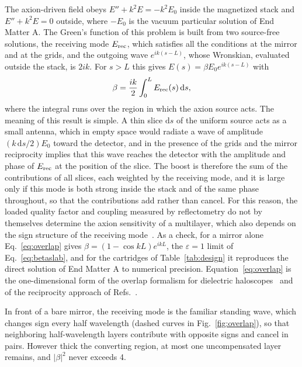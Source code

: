 \documentclass[
  aps,prl,reprint,superscriptaddress,
  amsmath,amssymb,floatfix,nofootinbib
]{revtex4-2}
\newcommand{\dd}{\mathrm d}
\begin{document}
The axion-driven field obeys $E''+k^2E=-k^2E_0$ inside the magnetized stack and $E''+k^2E=0$ outside, where $-E_0$ is the vacuum particular solution of End Matter A. The Green's function of this problem is built from two source-free solutions, the receiving mode $E_{\rm rec}$, which satisfies all the conditions at the mirror and at the grids, and the outgoing wave $e^{ik(s-L)}$, whose Wronskian, evaluated outside the stack, is $2ik$. For $s>L$ this gives $E(s)=\beta E_0e^{ik(s-L)}$ with
\begin{equation}
\beta=\frac{ik}{2}\int_0^L E_{\rm rec}(s)\,\dd s ,
\label{eq:overlap}
\end{equation}
where the integral runs over the region in which the axion source acts. The meaning of this result is simple. A thin slice $\dd s$ of the uniform source acts as a small antenna, which in empty space would radiate a wave of amplitude $(k\,\dd s/2)E_0$ toward the detector, and in the presence of the grids and the mirror reciprocity implies that this wave reaches the detector with the amplitude and phase of $E_{\rm rec}$ at the position of the slice. The boost is therefore the sum of the contributions of all slices, each weighted by the receiving mode, and it is large only if this mode is both strong inside the stack and of the same phase throughout, so that the contributions add rather than cancel. For this reason, the loaded quality factor and coupling measured by reflectometry do not by themselves determine the axion sensitivity of a multilayer, which also depends on the sign structure of the receiving mode~\cite{Garutti:2026asa}. As a check, for a mirror alone Eq.~\eqref{eq:overlap} gives $\beta=(1-\cos kL)e^{ikL}$, the $\varepsilon=1$ limit of Eq.~\eqref{eq:betaslab}, and for the cartridges of Table~\ref{tab:design} it reproduces the direct solution of End Matter A to numerical precision. Equation~\eqref{eq:overlap} is the one-dimensional form of the overlap formalism for dielectric haloscopes~\cite{Ioannisian:2017srr,Millar:2016cjp} and of the reciprocity approach of Refs.~\cite{Egge:2022gfp,Egge:2023cos}.

In front of a bare mirror, the receiving mode is the familiar standing wave, which changes sign every half wavelength (dashed curves in Fig.~\ref{fig:overlap}), so that neighboring half-wavelength layers contribute with opposite signs and cancel in pairs. However thick the converting region, at most one uncompensated layer remains, and $|\beta|^2$ never exceeds 4.
\end{document}
